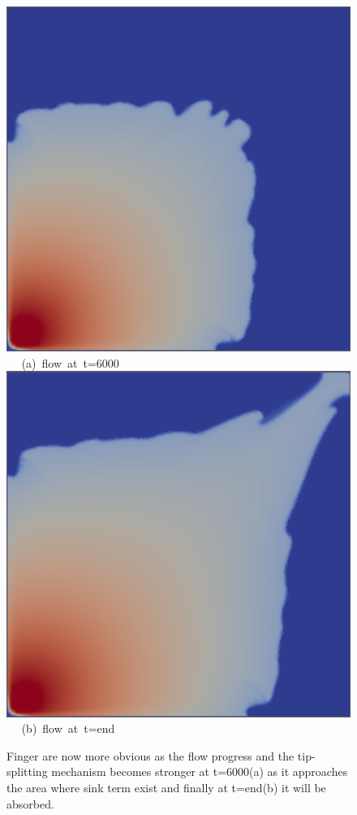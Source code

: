 \documentclass[preprint,authoryear,12pt]{elsarticle}
\begin{document}
\begin{figure}[h]
\vbox{
\hbox{\hspace{3.5cm}
\includegraphics[width=.5\textwidth]{./Pics1/Saffman_homogeneous/saffman_homo_fixed_6000.pdf} 
}
\vspace{0.0cm}
\hbox{\hspace{5.0cm} (a) flow at t=6000   
}
\vspace{0.25cm}
\hbox{\hspace{3.5cm}
\includegraphics[width=.5\textwidth]{./Pics1/Saffman_homogeneous/saffman_homo_fixed_end_1.pdf}
}
\vspace{0.0cm}
\hbox{\hspace{5.0cm} (b) flow at t=end   
}
}     
\caption{Finger are now more obvious as the flow progress and the tip-splitting mechanism becomes stronger at t=6000(a) as it approaches the area where sink term exist and finally at t=end(b) it will be absorbed.}
\label{fig:2c_homoheleshaw_10}
\end{figure}
\end{document}
